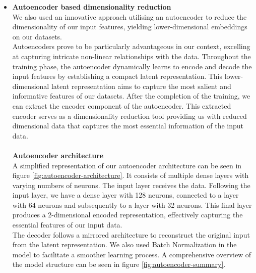 \begin{itemize}
	      	      
	\item \textbf{Autoencoder based dimensionality reduction}\\
	      We also used an innovative approach utilising an autoencoder to reduce the dimensionality of our input features, yielding lower-dimensional embeddings on our datasets.\\
	      Autoencoders prove to be particularly advantageous in our context, excelling at capturing intricate non-linear relationships with the data. Throughout the training phase, the autoencoder dynamically learns to encode and decode the input features by establishing a compact latent representation. This lower-dimensional latent representation aims to capture the most salient and informative features of our datasets. After the completion of the training, we can extract the encoder component of the autoencoder. This extracted encoder serves as a dimensionality reduction tool providing us with reduced dimensional data that captures the most essential information of the input data.\\ \\
	      \textbf{Autoencoder architecture}\\ 
	      A simplified representation of our autoencoder architecture can be seen in figure \ref{fig:autoencoder-architecture}. It consists of multiple dense layers with varying numbers of neurons. The input layer receives the data. Following the input layer, we have a dense layer with 128 neurons, connected to a layer with 64 neurons and subsequently to a layer with 32 neurons. This final layer produces a 2-dimensional encoded representation, effectively capturing the essential features of our input data. \\
	      The decoder follows a mirrored architecture to reconstruct the original input from the latent representation. We also used Batch Normalization in the model to facilitate a smoother learning process. A comprehensive overview of the model structure can be seen in figure \ref{fig:autoencoder-summary}.\\ \\
	      

\end{itemize}
